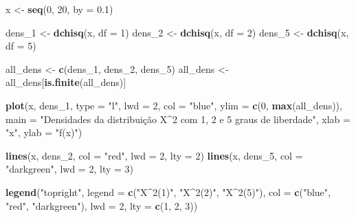 \documentclass[
]{article}
\newenvironment{Shaded}{\begin{snugshade}}{\end{snugshade}}
\newcommand{\AttributeTok}[1]{\textcolor[rgb]{0.13,0.29,0.53}{#1}}
\newcommand{\DecValTok}[1]{\textcolor[rgb]{0.00,0.00,0.81}{#1}}
\newcommand{\FloatTok}[1]{\textcolor[rgb]{0.00,0.00,0.81}{#1}}
\newcommand{\FunctionTok}[1]{\textcolor[rgb]{0.13,0.29,0.53}{\textbf{#1}}}
\newcommand{\NormalTok}[1]{#1}
\newcommand{\OtherTok}[1]{\textcolor[rgb]{0.56,0.35,0.01}{#1}}
\newcommand{\StringTok}[1]{\textcolor[rgb]{0.31,0.60,0.02}{#1}}
\begin{document}
\begin{Shaded}
\begin{Highlighting}[]
\NormalTok{x }\OtherTok{\textless{}{-}} \FunctionTok{seq}\NormalTok{(}\DecValTok{0}\NormalTok{, }\DecValTok{20}\NormalTok{, }\AttributeTok{by =} \FloatTok{0.1}\NormalTok{)}

\NormalTok{dens\_1 }\OtherTok{\textless{}{-}} \FunctionTok{dchisq}\NormalTok{(x, }\AttributeTok{df =} \DecValTok{1}\NormalTok{)}
\NormalTok{dens\_2 }\OtherTok{\textless{}{-}} \FunctionTok{dchisq}\NormalTok{(x, }\AttributeTok{df =} \DecValTok{2}\NormalTok{)}
\NormalTok{dens\_5 }\OtherTok{\textless{}{-}} \FunctionTok{dchisq}\NormalTok{(x, }\AttributeTok{df =} \DecValTok{5}\NormalTok{)}


\NormalTok{all\_dens }\OtherTok{\textless{}{-}} \FunctionTok{c}\NormalTok{(dens\_1, dens\_2, dens\_5)}
\NormalTok{all\_dens }\OtherTok{\textless{}{-}}\NormalTok{ all\_dens[}\FunctionTok{is.finite}\NormalTok{(all\_dens)]}

\FunctionTok{plot}\NormalTok{(x, dens\_1, }\AttributeTok{type =} \StringTok{"l"}\NormalTok{, }\AttributeTok{lwd =} \DecValTok{2}\NormalTok{, }\AttributeTok{col =} \StringTok{"blue"}\NormalTok{,}
     \AttributeTok{ylim =} \FunctionTok{c}\NormalTok{(}\DecValTok{0}\NormalTok{, }\FunctionTok{max}\NormalTok{(all\_dens)),}
     \AttributeTok{main =} \StringTok{"Densidades da distribuição X\^{}2 com 1, 2 e 5 graus de liberdade"}\NormalTok{,}
     \AttributeTok{xlab =} \StringTok{"x"}\NormalTok{, }\AttributeTok{ylab =} \StringTok{"f(x)"}\NormalTok{)}


\FunctionTok{lines}\NormalTok{(x, dens\_2, }\AttributeTok{col =} \StringTok{"red"}\NormalTok{, }\AttributeTok{lwd =} \DecValTok{2}\NormalTok{, }\AttributeTok{lty =} \DecValTok{2}\NormalTok{)}
\FunctionTok{lines}\NormalTok{(x, dens\_5, }\AttributeTok{col =} \StringTok{"darkgreen"}\NormalTok{, }\AttributeTok{lwd =} \DecValTok{2}\NormalTok{, }\AttributeTok{lty =} \DecValTok{3}\NormalTok{)}

\FunctionTok{legend}\NormalTok{(}\StringTok{"topright"}\NormalTok{, }\AttributeTok{legend =} \FunctionTok{c}\NormalTok{(}\StringTok{"X\^{}2(1)"}\NormalTok{, }\StringTok{"X\^{}2(2)"}\NormalTok{, }\StringTok{"X\^{}2(5)"}\NormalTok{),}
       \AttributeTok{col =} \FunctionTok{c}\NormalTok{(}\StringTok{"blue"}\NormalTok{, }\StringTok{"red"}\NormalTok{, }\StringTok{"darkgreen"}\NormalTok{), }\AttributeTok{lwd =} \DecValTok{2}\NormalTok{, }\AttributeTok{lty =} \FunctionTok{c}\NormalTok{(}\DecValTok{1}\NormalTok{, }\DecValTok{2}\NormalTok{, }\DecValTok{3}\NormalTok{))}
\end{Highlighting}
\end{Shaded}
\end{document}
